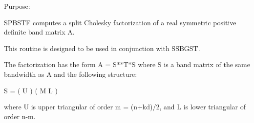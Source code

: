  \begin{DoxyParagraph}{Purpose\+: }
\begin{DoxyVerb} SPBSTF computes a split Cholesky factorization of a real
 symmetric positive definite band matrix A.

 This routine is designed to be used in conjunction with SSBGST.

 The factorization has the form  A = S**T*S  where S is a band matrix
 of the same bandwidth as A and the following structure:

   S = ( U    )
       ( M  L )

 where U is upper triangular of order m = (n+kd)/2, and L is lower
 triangular of order n-m.\end{DoxyVerb}
 
\end{DoxyParagraph}

